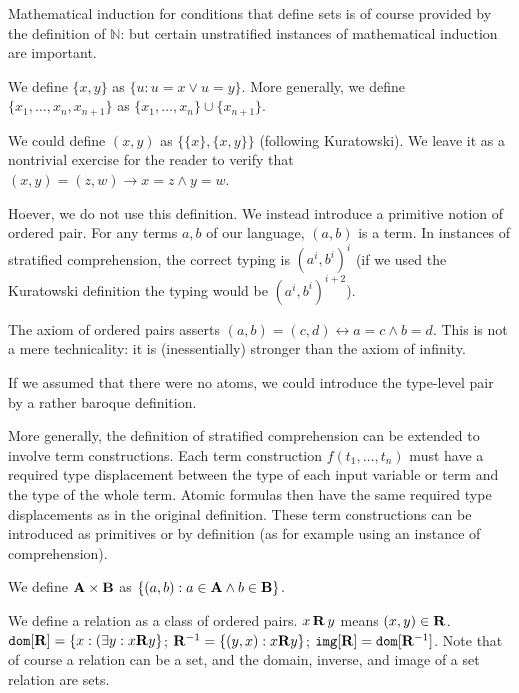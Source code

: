 \documentclass[12pt]{article}
\begin{document}
Mathematical induction for conditions that define sets is of course provided by the definition of $\mathbb N$:  but certain unstratified instances of mathematical induction are important.

We define $\{x,y\}$ as $\{u:u=x \vee u=y\}$.  More generally, we define $\{x_1,\ldots,x_n,x_{n+1}\}$ as $\{x_1,\ldots,x_n\} \cup \{x_{n+1}\}$.

We could define $(x,y)$ as $\{\{x\},\{x,y\}\}$ (following Kuratowski).  We leave it as a nontrivial exercise for the reader to verify that $(x,y) = (z,w) \rightarrow x=z \wedge y=w$. 

Hoever, we do not use this definition.  We instead introduce a primitive notion of ordered pair.  For any terms $a,b$ of our language, $(a,b)$ is a term.  In instances of stratified comprehension,
the correct typing is $(a^i,b^i)^i$ (if we used the Kuratowski definition the typing would be $(a^i,b^i)^{i+2}$).  

The axiom of ordered pairs asserts $(a,b) = (c,d) \leftrightarrow a=c \wedge b=d$.  This is not a mere technicality:  it is (inessentially) stronger than the axiom of infinity.

If we assumed that there were no atoms, we could introduce the type-level pair by a rather baroque definition.

More generally, the definition of stratified comprehension can be extended to involve term constructions.  Each term construction $f(t_1,\ldots,t_n)$ must have a required type displacement between
the type of each input variable or term  and the type of the whole term.   Atomic formulas then have the same required type displacements as in the original definition.  These term constructions can be introduced as
primitives or by definition (as for example using an instance of comprehension).

 We define ${\bf A} \times {\bf B}$ as $\{(a,b):a \in {\bf A} \wedge b \in {\bf B}\}$.

We define a relation as a class of ordered pairs.  $x \, {\bf R} \, y$ means $(x,y) \in {\bf R}$.  ${\tt dom}[{\bf R}] = \{x: (\exists y:x {\bf R} y\}$;  ${\bf R}^{-1} = \{(y,x):x {\bf R} y\}$;  ${\tt img}[{\bf R}] = {\tt dom}[{\bf R}^{-1}]$.  Note that of course a relation can be a set, and the domain, inverse, and image of a set relation are sets.
\end{document}
